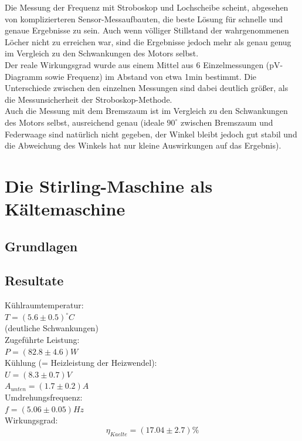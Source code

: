 \documentclass[12pt,a4paper]{article}
\begin{document}
\begin{multicols}{2}
\noindent Die Messung der Frequenz mit Stroboskop und Lochscheibe scheint, abgesehen von komplizierteren Sensor-Messaufbauten, die beste Lösung für schnelle und genaue Ergebnisse zu sein. Auch wenn völliger Stillstand der wahrgenommenen Löcher nicht zu erreichen war, sind die Ergebnisse jedoch mehr als genau genug im Vergleich zu den Schwankungen des Motors selbst.\\
Der reale Wirkungsgrad wurde aus einem Mittel aus 6 Einzelmessungen (pV-Diagramm sowie Frequenz) im Abstand von etwa 1min bestimmt. Die Unterschiede zwischen den einzelnen Messungen sind dabei deutlich größer, als die Messunsicherheit der Stroboskop-Methode.\\
Auch die Messung mit dem Bremszaum ist im Vergleich zu den Schwankungen des Motors selbst, ausreichend genau (ideale $90^\circ$ zwischen Bremszaum und Federwaage sind natürlich nicht gegeben, der Winkel bleibt jedoch gut stabil und die Abweichung des Winkels hat nur kleine Auswirkungen auf das Ergebnis).



\section{Die Stirling-Maschine als Kältemaschine}

\subsection{Grundlagen}


\subsection{Resultate}


Kühlraumtemperatur:\\ 
$T= (5.6 \pm 0.5)^{\circ}C$\\
\indent (deutliche Schwankungen)\\
Zugeführte Leistung:\\
$P=(82.8 \pm 4.6)W$\\
\noindent Kühlung (= Heizleistung der Heizwendel):\\ 
$U= (8.3 \pm 0.7)V$\\
$A_{unten} = (1.7 \pm 0.2)A$\\
\noindent Umdrehungsfrequenz:\\
$f = (5.06\pm 0.05)Hz$\\
Wirkungsgrad:\\
$$\eta_{Kaelte}=(17.04\pm 2.7)\%$$


\end{multicols}
\end{document}
